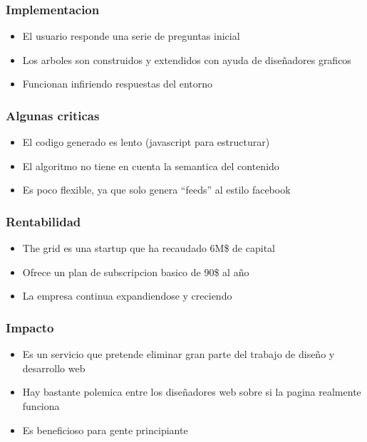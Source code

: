 \documentclass{beamer}
\begin{document}
\begin{frame}
  \frametitle{Implementacion}
    \begin{itemize}
      \item<1-> El usuario responde una serie de preguntas inicial
      \item<2-> Los arboles son construidos y extendidos con
        ayuda de diseñadores graficos
      \item<3-> Funcionan infiriendo respuestas del entorno
    \end{itemize}
\end{frame}

\begin{frame}
  \frametitle{Algunas criticas}
    \begin{itemize}
      \item<1-> El codigo generado es lento (javascript para estructurar)
      \item<2-> El algoritmo no tiene en cuenta la semantica del contenido
      \item<3-> Es poco flexible, ya que solo genera ``feeds'' al estilo facebook
    \end{itemize}
\end{frame}

\begin{frame}
  \frametitle{Rentabilidad}
    \begin{itemize}
      \item<1-> The grid es una startup que ha recaudado 6M\$ de capital
      \item<2-> Ofrece un plan de subscripcion basico de 90\$ al año
      \item<3-> La empresa continua expandiendose y creciendo
    \end{itemize}
\end{frame}

\begin{frame}
  \frametitle{Impacto}
    \begin{itemize}
      \item<1-> Es un servicio que pretende eliminar gran parte del 
        trabajo de diseño y desarrollo web
      \item<2-> Hay bastante polemica entre los diseñadores web sobre
        si la pagina realmente funciona
      \item<3-> Es beneficioso para gente principiante
    \end{itemize}
\end{frame}
\end{document}
